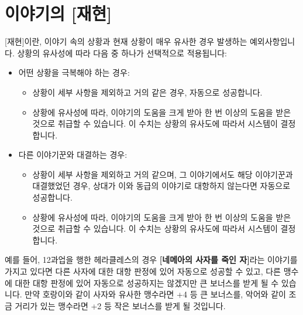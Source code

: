 \documentclass{report}
\begin{document}
	\section*{이야기의 [재현]}
	[재현]이란, 이야기 속의 상황과 현재 상황이 매우 유사한 경우 발생하는 예외사항입니다. 상황의 유사성에 따라 다음 중 하나가 선택적으로 적용됩니다:
	\begin{itemize}
		\item 어떤 상황을 극복해야 하는 경우:
		
		\begin{itemize}
			\item 상황이 세부 사항을 제외하고 거의 같은 경우, 자동으로 성공합니다.
			\item 상황에 유사성에 따라, 이야기의 도움을 크게 받아 한 번 이상의 도움을 받은 것으로 취급할 수 있습니다. 이 수치는 상황의 유사도에 따라서 시스템이 결정합니다.
		\end{itemize}
		
		\item 다른 이야기꾼와 대결하는 경우:
		
		\begin{itemize}
			\item 상황이 세부 사항을 제외하고 거의 같으며, 그 이야기에서도 해당 이야기꾼과 대결했었던 경우, 상대가 이와 동급의 이야기로 대항하지 않는다면 자동으로 성공합니다.
			\item 상황에 유사성에 따라, 이야기의 도움을 크게 받아 한 번 이상의 도움을 받은 것으로 취급할 수 있습니다. 이 수치는 상황의 유사도에 따라서 시스템이 결정합니다.
		\end{itemize}
	\end{itemize}
	예를 들어, 12과업을 행한 헤라클레스의 경우 \textbf{[네메아의 사자를 죽인 자]}라는 이야기를 가지고 있다면 다른 사자에 대한 대항 판정에 있어 자동으로 성공할 수 있고, 다른 맹수에 대한 대항 판정에 있어 자동으로 성공하지는 않겠지만 큰 보너스를 받게 될 수 있습니다. 만약 호랑이와 같이 사자와 유사한 맹수라면 +4 등 큰 보너스를, 악어와 같이 조금 거리가 있는 맹수라면 +2 등 작은 보너스를 받게 될 것입니다.
	
\end{document}
